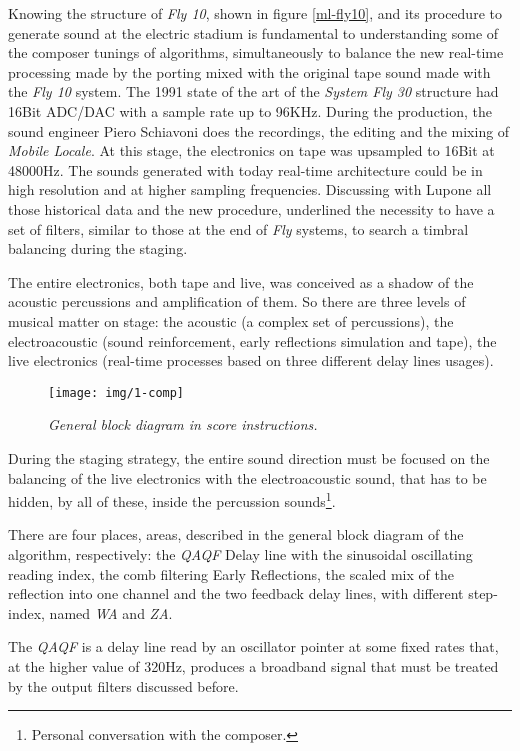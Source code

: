 \documentclass[twoside,a4paper]{article}
\begin{document}
Knowing the structure of \emph{Fly 10}, shown in figure \ref{ml-fly10}, and its procedure to generate sound at the electric stadium is fundamental to understanding some of the composer tunings of algorithms,  simultaneously to balance the new real-time processing made by the porting mixed with the original tape sound made with the \emph{Fly 10} system. The 1991 state of the art of the \emph{System Fly 30} structure had 16Bit ADC/DAC with a sample rate up to 96KHz. During the production, the sound engineer Piero Schiavoni does the recordings, the editing and the mixing of \emph{Mobile Locale}. At this stage, the electronics on tape was upsampled to 16Bit at 48000Hz. The sounds generated with today real-time architecture could be in high resolution and at higher sampling frequencies. Discussing with Lupone all those historical data and the new procedure, underlined the necessity to have a set of filters, similar to those at the end of \emph{Fly} systems, to search a timbral balancing during the staging.

The entire electronics, both tape and live, was conceived as a shadow of the acoustic percussions and amplification of them. So there are three levels of musical matter on stage: the acoustic (a complex set of percussions), the electroacoustic (sound reinforcement, early reflections simulation and tape), the live electronics (real-time processes based on three different delay lines usages).

\begin{figure}[ht]
\centerline{\texttt{[image: img/1-comp]}}
\caption{\label{ml-gen-dia}{\it General block diagram in score instructions.}}
\end{figure}

During the staging strategy, the entire sound direction must be focused on the balancing of the live electronics with the electroacoustic sound, that has to be hidden, by all of these, inside the percussion sounds\footnote{Personal conversation with the composer.}.

There are four places, areas, described in the general block diagram of the algorithm, respectively: the \emph{QAQF} Delay line with the sinusoidal oscillating reading index, the comb filtering  Early Reflections, the scaled mix of the reflection into one channel and the two feedback delay lines, with different step-index, named \emph{WA} and \emph{ZA}.


The \emph{QAQF} is a delay line read by an oscillator pointer at some fixed rates that, at the higher value of 320Hz, produces a broadband signal that must be treated by the output filters discussed before.
\end{document}

